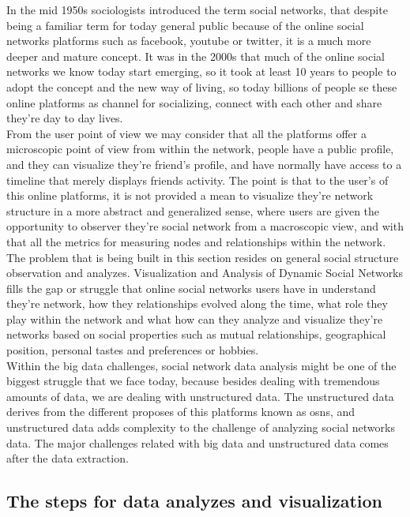 In the mid 1950s sociologists introduced the term social networks, that despite being a familiar term for today general public because of the online social networks platforms such as facebook, youtube or twitter, it is a much more deeper and mature concept. It was in the 2000s that much of the online social networks we know today start emerging, so it took at least 10 years to people to adopt the concept and the new way of living, so today billions of people se these online platforms as channel for socializing, connect with each other and share they're day to day lives.\\
\indent From the user point of view we may consider that all the platforms offer a microscopic point of view from within the network, people have a public profile, and they can visualize they're friend's profile, and have normally have access to a timeline that merely displays friends activity. The point is that to the user's of this online platforms, it is not provided a mean to visualize they're network structure in a more abstract and generalized sense, where users are given the opportunity to observer they're social network from a macroscopic view, and with that all the metrics for measuring nodes and relationships within the network.\\
\indent The problem that is being built in this section resides on general social structure observation and analyzes. Visualization and Analysis of Dynamic Social Networks fills the gap or struggle that online social networks users have in understand they're network, how they relationships evolved along the time, what role they play within the network and what how can they analyze and visualize they're networks based on social properties such as mutual relationships, geographical position, personal tastes and preferences or hobbies.\\
\indent Within the big data challenges, social network data analysis might be one of the biggest struggle that we face today, because besides dealing with tremendous amounts of data, we are dealing with unstructured data. The unstructured data derives from the different proposes of this platforms known as \glspl{osn}, and unstructured data adds complexity to the challenge of analyzing social networks data. The major challenges related with big data and unstructured data comes after the data extraction.

\subsection*{The steps for data analyzes and visualization}

